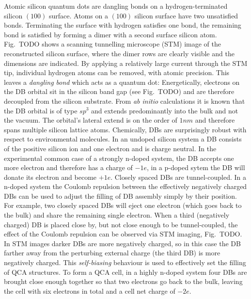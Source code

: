 Atomic silicon quantum dots are dangling bonds on a hydrogen-terminated silicon
$(100)$ surface. Atoms on a $(100)$ silicon surface have two unsatisfied bonds.
Terminating the surface with hydrogen satisfies one bond, the remaining bond is
satisfied by forming a dimer with a second surface silicon atom. Fig.~TODO shows
a scanning tunnelling microscope (STM) image of the reconstructed silicon
surface, where the dimer rows are clearly visible and the dimensions are
indicated. By applying a relatively large current through the STM tip,
individual hydrogen atoms can be removed, with atomic precision. This leaves a
\emph{dangling bond} which acts as a quantum dot: Energetically, electrons on
the DB orbital sit in the silicon band gap (see Fig.~TODO) and are therefore
decoupled from the silicon substrate. From \emph{ab initio} calculations it is
known that the DB orbital is of type $sp^3$ and extends predominantly into the
bulk and not the vacuum. The orbital's lateral extend is on the order of $1nm$
and therefore spans multiple silicon lattice atoms. Chemically, DBs are
surprisingly robust with respect to environmental molecules. In an undoped
silicon system a DB consists of the positive silicon ion and one electron and is
charge neutral. In the experimental common case of a strongly n-doped system,
the DB accepts one more electron and therefore has a charge of $-1e$, in a
p-doped sytem the DB will donate its electron and become $+1e$. Closely spaced
DBs are tunnel-coupled. In a n-doped system the Coulomb repulsion between the
effectively negatively charged DBs can be used to adjust the filling of DB
assembly simply by their position. For example, two closely spaced DBs will
eject one electron (which goes back to the bulk) and share the remaining single
electron. When a third (negatively charged) DB is placed close by, but not close
enough to be tunnel-coupled, the effect of the Coulomb repulsion can be observed
via STM imaging, Fig.~TODO. In STM images darker DBs are more negatively
charged, so in this case the DB farther away from the perturbing external charge
(the third DB) is more negatively charged. This \emph{self-biasing} behaviour is
used to effectively set the filling of QCA structures. To form a QCA cell, in a
highly n-doped system four DBs are brought close enough together so that two
electrons go back to the bulk, leaving the cell with six electrons in total and
a cell net charge of $-2e$.

